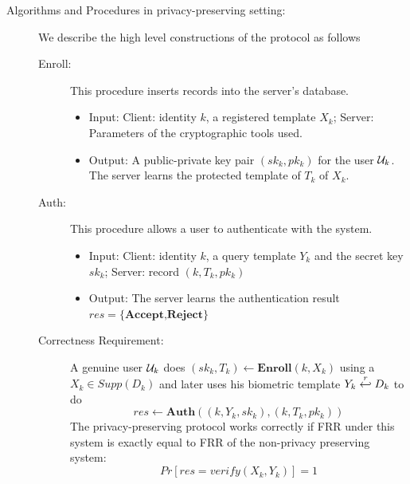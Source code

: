 \begin{description}
\item[Algorithms and Procedures in privacy-preserving setting:] We describe the high level constructions of the protocol
  as follows
  \begin{description}
  \item[Enroll:] This procedure inserts records into the server's database.
    \begin{itemize}
    \item Input: Client: identity $k$, a registered template $X_k$; Server: Parameters of the cryptographic tools used.
    \item Output: A public-private key pair $(sk_k, pk_k)$ for the user $\mathcal{U}_k$. The server learns the protected
      template of $T_k$ of $X_k$.
    \end{itemize}
  \item[Auth:] This procedure allows a user to authenticate with the system.
    \begin{itemize}
    \item Input: Client: identity $k$, a query template $Y_k$ and the secret key $sk_k$; Server: record $(k, T_k, pk_k)$
    \item Output: The server learns the authentication result $res=\{\textbf{Accept,Reject}\}$
    \end{itemize}

  \item[Correctness Requirement:] A genuine user $\mathcal{U}_k$ does $(sk_k, T_k) \gets \mathbf{Enroll}(k, X_k)$ using a
    $X_k \in Supp(D_k)$ and later uses his biometric template $Y_k \stackrel{r}{\hookleftarrow} D_k$ to do
    $$res \gets \mathbf{Auth}( (k, Y_k, sk_k), (k, T_k, pk_k))$$
    The privacy-preserving protocol works correctly if FRR under this system is exactly equal to FRR of the non-privacy
    preserving system:
    \[
      Pr[res = verify(X_k,Y_k)] = 1
    \]
  \end{description}
\end{description}

